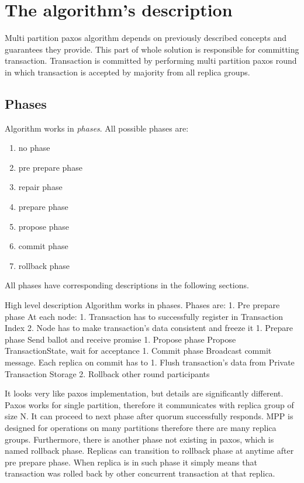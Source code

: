 \section{The algorithm's description}
Multi partition paxos algorithm depends on previously described concepts and guarantees they provide. This part of whole solution is responsible for committing transaction. Transaction is committed by performing multi partition paxos round in which transaction is accepted by majority from all replica groups. 

\subsection{Phases}
Algorithm works in \emph{phases}. All possible phases are: 
\begin{enumerate}
\item no phase
\item pre prepare phase
\item repair phase
\item prepare phase
\item propose phase
\item commit phase
\item rollback phase
\end{enumerate}
All phases have corresponding descriptions in the following sections.



        High level description
Algorithm works in phases. Phases are:
1. Pre prepare phase
At each node:
   1. Transaction has to successfully register in Transaction Index
   2. Node has to make transaction’s data consistent and freeze it
1. Prepare phase
Send ballot and receive promise
1. Propose phase
Propose TransactionState, wait for acceptance
1. Commit phase
        Broadcast commit message. Each replica on commit has to
   1. Flush transaction’s data from Private Transaction Storage
   2. Rollback other round participants
        
It looks very like paxos implementation, but details are significantly different. 
Paxos works for single partition, therefore it communicates with replica group of size N. It can proceed to next phase after quorum successfully responds. 
MPP is designed for operations on many partitions therefore there are many replica groups. 
Furthermore, there is another phase not existing in paxos, which is named rollback phase. Replicas can transition to rollback phase at anytime after pre prepare phase. When replica is in such phase it simply means that transaction was rolled back by other concurrent transaction at that replica. 


